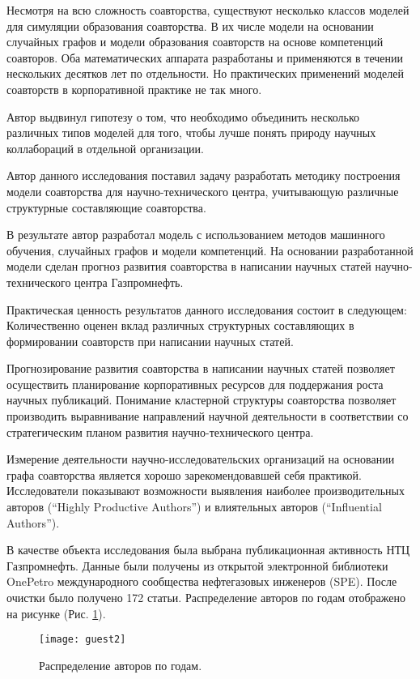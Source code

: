 Несмотря на всю сложность соавторства, существуют несколько классов моделей для симуляции образования соавторства. 
В их числе модели на основании случайных графов и модели образования соавторств на основе компетенций соавторов. 
Оба математических аппарата разработаны и применяются в течении нескольких десятков лет по отдельности. 
Но практических применений моделей соавторств в корпоративной практике не так много.

Автор выдвинул гипотезу о том, что необходимо объединить несколько различных типов моделей для того, чтобы лучше понять природу научных коллабораций в отдельной организации. 

Автор данного исследования поставил задачу разработать методику построения модели соавторства для научно-технического центра, учитывающую различные структурные составляющие соавторства. 

В результате автор разработал модель с использованием методов машинного обучения, случайных графов и модели компетенций. 
На основании разработанной модели сделан прогноз развития соавторства в написании научных статей научно-технического центра Газпромнефть.

Практическая ценность результатов данного исследования состоит в следующем: Количественно оценен вклад различных структурных составляющих в формировании соавторств при написании научных статей.

Прогнозирование развития соавторства в написании научных статей позволяет осуществить 
планирование корпоративных ресурсов для поддержания роста научных публикаций.
Понимание кластерной структуры соавторства позволяет производить выравнивание направлений научной деятельности в соответствии со стратегическим планом развития научно-технического центра.


Измерение деятельности научно-исследовательских организаций на основании графа соавторства является хорошо зарекомендовавшей себя практикой. 
Исследователи показывают возможности выявления наиболее производительных авторов (``Highly Productive Authors'') и влиятельных авторов (``Influential Authors''). 

В качестве объекта исследования была выбрана публикационная активность НТЦ Газпромнефть. 
Данные были получены из открытой электронной библиотеки OnePetro международного сообщества нефтегазовых инженеров (SPE). 
После очистки было получено 172 статьи. 
Распределение авторов по годам отображено на рисунке (Рис. \ref{fig:guest2}).

\begin{figure}[H]
  \caption{Распределение авторов по годам.}
  \centering
    \texttt{[image: guest2]}
  \label{fig:guest2}
\end{figure}  

